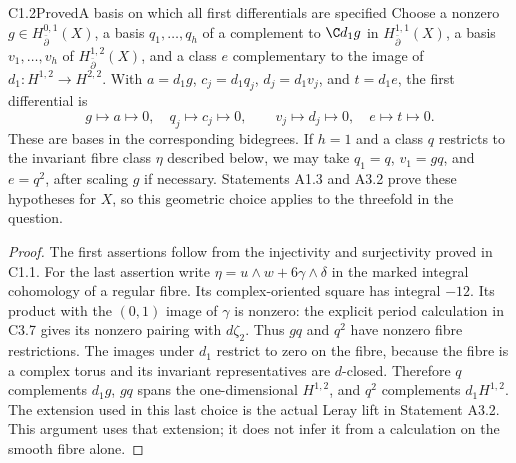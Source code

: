 \begin{claim}{C1.2}{Proved}{A basis on which all first differentials are specified}
Choose a nonzero $g\in H^{0,1}_{\bar\partial}(X)$, a basis
$q_1,\ldots,q_h$ of a complement to $\C d_1g$ in
$H^{1,1}_{\bar\partial}(X)$, a basis $v_1,\ldots,v_h$ of
$H^{1,2}_{\bar\partial}(X)$, and a class $e$ complementary to the
image of $d_1:H^{1,2}\to H^{2,2}$.  With
$a=d_1g$, $c_j=d_1q_j$, $d_j=d_1v_j$, and $t=d_1e$, the first
differential is
\[
g\mapsto a\mapsto0,\quad q_j\mapsto c_j\mapsto0,
\qquad v_j\mapsto d_j\mapsto0,\quad e\mapsto t\mapsto0.
\]
These are bases in the corresponding bidegrees.  If $h=1$ and a
class $q$ restricts to the invariant fibre class $\eta$ described below,
we may take $q_1=q$, $v_1=gq$, and $e=q^2$, after scaling $g$ if
necessary.  Statements A1.3 and A3.2 prove these hypotheses for $X$,
so this geometric choice applies to the threefold in the question.
\end{claim}
\begin{proof}
The first assertions follow from the injectivity and surjectivity
proved in C1.1.  For the last assertion write
$\eta=u\wedge w+6\gamma\wedge\delta$ in the marked integral
cohomology of a regular fibre.  Its complex-oriented square has
integral $-12$.  Its product with the $(0,1)$ image of $\gamma$ is
nonzero: the explicit period calculation in C3.7 gives its nonzero
pairing with $d\zeta_2$.  Thus $gq$ and $q^2$ have nonzero fibre
restrictions.  The images under $d_1$ restrict to zero on the fibre,
because the fibre is a complex torus and its invariant representatives
are $d$-closed.  Therefore $q$ complements $d_1g$, $gq$ spans the
one-dimensional $H^{1,2}$, and $q^2$ complements $d_1H^{1,2}$.
The extension used in this last choice is the actual Leray lift in
Statement A3.2.  This argument uses that extension; it does not infer
it from a calculation on the smooth fibre alone.
\end{proof}

